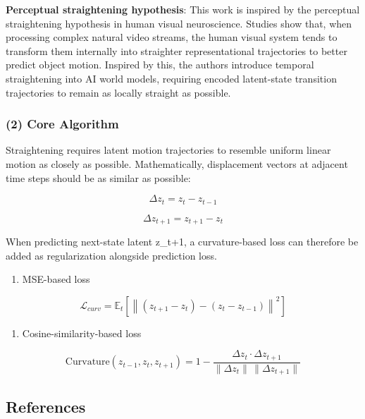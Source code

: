 \textbf{Perceptual straightening hypothesis}: This work is inspired by the perceptual straightening hypothesis in human visual neuroscience. Studies show that, when processing complex natural video streams, the human visual system tends to transform them internally into straighter representational trajectories to better predict object motion. Inspired by this, the authors introduce temporal straightening into AI world models, requiring encoded latent-state transition trajectories to remain as locally straight as possible.

\hypertarget{core-algorithm-1}{%
\subsubsection{(2) Core Algorithm}\label{core-algorithm-1}}

Straightening requires latent motion trajectories to resemble uniform linear motion as closely as possible. Mathematically, displacement vectors at adjacent time steps should be as similar as possible:

\[
\Delta z_t = z_t - z_{t-1}
\]

\[
\Delta z_{t+1} = z_{t+1} - z_t
\]

When predicting next-state latent z\_t+1, a curvature-based loss can therefore be added as regularization alongside prediction loss.

\begin{enumerate}
\def\labelenumi{\arabic{enumi}.}
\tightlist
\item
  MSE-based loss
\end{enumerate}

\[
\mathcal{L}_{curv} = \mathbb{E}_t\left[\left\| (z_{t+1}-z_t) - (z_t-z_{t-1}) \right\|^2\right]
\]

\begin{enumerate}
\def\labelenumi{\arabic{enumi}.}
\setcounter{enumi}{1}
\tightlist
\item
  Cosine-similarity-based loss
\end{enumerate}

\[
\mathrm{Curvature}(z_{t-1}, z_t, z_{t+1}) = 1 - \frac{\Delta z_t \cdot \Delta z_{t+1}}{\|\Delta z_t\|\,\|\Delta z_{t+1}\|}
\]

\FloatBarrier
{}
\hypertarget{references-157}{%
\subsection{References}\label{references-157}}

